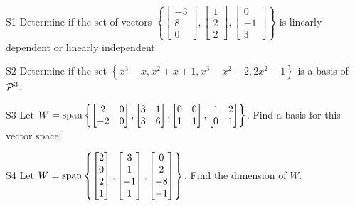 \documentclass{sbgLAexam}
\begin{document}
\begin{problem}{S1}
Determine if the set of vectors $\left\{ \begin{bmatrix} -3 \\ 8 \\ 0 \end{bmatrix}, \begin{bmatrix} 1 \\ 2 \\ 2 \end{bmatrix}, \begin{bmatrix} 0 \\ -1 \\ 3 \end{bmatrix} \right\}$ is  linearly dependent or linearly independent
\end{problem}

\begin{problem}{S2}
Determine if the set $\left\{ x^3-x, x^2+x+1, x^3-x^2+2, 2x^2-1 \right\}$ is a basis of $\P^3$.
\end{problem}
\newpage

\begin{problem}{S3}
Let \(
  W={\rm span}\left\{
    \begin{bmatrix} 2 & 0 \\ -2 & 0 \end{bmatrix},
    \begin{bmatrix} 3 & 1 \\ 3 & 6 \end{bmatrix},
    \begin{bmatrix} 0 & 0 \\ 1 & 1 \end{bmatrix},
    \begin{bmatrix} 1 & 2 \\ 0 & 1 \end{bmatrix}
  \right\}
\). Find a basis for this vector space.
\end{problem}

\begin{problem}{S4}
Let \(
  W={\rm span}\left\{
    \begin{bmatrix} 2 \\ 0 \\ 2 \\ 1 \end{bmatrix},
    \begin{bmatrix} 3 \\ 1 \\ -1 \\ 1 \end{bmatrix},
    \begin{bmatrix} 0 \\ 2 \\ -8 \\ -1 \end{bmatrix}
  \right\}
\). Find the dimension of \(W\).
\end{problem}
\newpage
\end{document}

